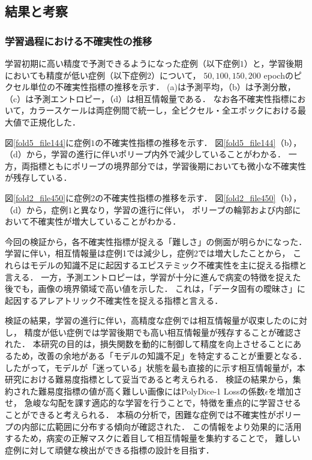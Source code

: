 \documentclass[10pt, a4paper, twocolumn]{jarticle}
\begin{document}
\subsection{結果と考察}

\subsubsection{学習過程における不確実性の推移}
学習初期に高い精度で予測できるようになった症例（以下症例$1$）と，学習後期においても精度が低い症例（以下症例$2$）について，
$50, 100, 150, 200$ epochのピクセル単位の不確実性指標の推移を示す．
(a)は予測平均，（b）は予測分散，（c）は予測エントロピー，（d）は相互情報量である．
なお各不確実性指標において，カラースケールは両症例間で統一し，全ピクセル・全エポックにおける最大値で正規化した．

図\ref{fold5_file144}に症例$1$の不確実性指標の推移を示す．
図\ref{fold5_file144}（b），（d）から，学習の進行に伴いポリープ内外で減少していることがわかる．
一方，両指標ともにポリープの境界部分では，学習後期においても微小な不確実性が残存している．

図\ref{fold2_file450}に症例2の不確実性指標の推移を示す．
図\ref{fold2_file450}（b），（d）から，症例$1$と異なり，学習の進行に伴い，
ポリープの輪郭および内部において不確実性が増大していることがわかる．

今回の検証から，各不確実性指標が捉える「難しさ」の側面が明らかになった．
学習に伴い，相互情報量は症例1では減少し，症例2では増大したことから，
これらはモデルの知識不足に起因するエピステミック不確実性を主に捉える指標と言える．
一方，予測エントロピーは，学習が十分に進んで病変の特徴を捉えた後でも，画像の境界領域で高い値を示した．
これは，「データ固有の曖昧さ」に起因するアレアトリック不確実性を捉える指標と言える．

検証の結果，学習の進行に伴い，高精度な症例では相互情報量が収束したのに対し，
精度が低い症例では学習後期でも高い相互情報量が残存することが確認された．
本研究の目的は，損失関数を動的に制御して精度を向上させることにあるため，改善の余地がある「モデルの知識不足」を特定することが重要となる．
したがって，モデルが「迷っている」状態を最も直接的に示す相互情報量が，本研究における難易度指標として妥当であると考えられる．
検証の結果から，集約された難易度指標の値が高く難しい画像にはPolyDice-1 Lossの係数$\epsilon$を増加させ，
急峻な勾配を課す適応的な学習を行うことで，特徴を重点的に学習させることができると考えられる．
本稿の分析で，困難な症例では不確実性がポリープの内部に広範囲に分布する傾向が確認された．
この情報をより効果的に活用するため，病変の正解マスクに着目して相互情報量を集約することで，
難しい症例に対して頑健な検出ができる指標の設計を目指す．
\end{document}
